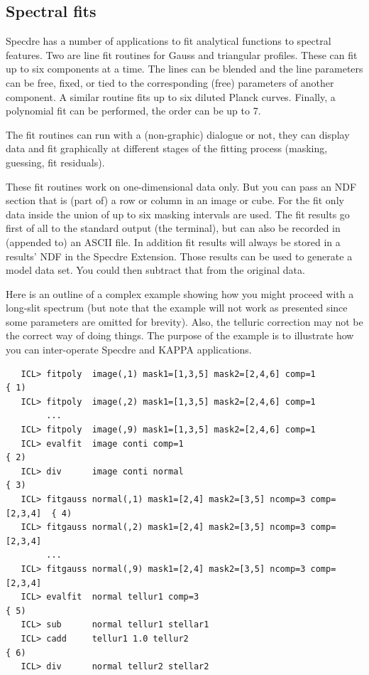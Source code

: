 \documentclass[11pt,twoside]{article}
\newcommand{\xref}[3]{#1}
\newcommand{\xlabel}[1]{}
\begin{document}

\subsection{\label{specdrespecfit}\xlabel{specdrespecfit}Spectral fits}

   Specdre has a number of applications to fit analytical functions to
   spectral features. Two are line fit routines for Gauss and triangular
   profiles. These can fit up to six components at a time. The lines can
   be blended and the line parameters can be free, fixed, or tied to the
   corresponding (free) parameters of another component. A similar
   routine fits up to six diluted Planck curves.  Finally, a polynomial
   fit can be performed, the order can be up to 7.

   The fit routines can run with a (non-graphic) dialogue or not, they
   can display data and fit graphically at different stages of the
   fitting process (masking, guessing, fit residuals).

   These fit routines work on one-dimensional data only. But you can
   pass an NDF section that is (part of) a row or column in an image or
   cube. For the fit only data inside the union of up to six masking
   intervals are used. The fit results go first of all to the standard
   output (the terminal), but can also be recorded in (appended to) an
   ASCII file. In addition fit results will always be stored in a
   results' NDF in the Specdre Extension. Those results can be used to
   generate a model data set. You could then subtract that from the
   original data.

   Here is an outline of a complex example showing how you might proceed
   with a long-slit spectrum (but note that the example will not work
   as presented since some parameters are omitted for brevity).  Also,
   the telluric correction may not be the correct way of doing
   things. The purpose of the example is to illustrate how you can
   inter-operate Specdre and \xref{KAPPA}{sun95}{} applications.

\begin{verbatim}
   ICL> fitpoly  image(,1) mask1=[1,3,5] mask2=[2,4,6] comp=1             { 1)
   ICL> fitpoly  image(,2) mask1=[1,3,5] mask2=[2,4,6] comp=1
        ...
   ICL> fitpoly  image(,9) mask1=[1,3,5] mask2=[2,4,6] comp=1
   ICL> evalfit  image conti comp=1                                       { 2)
   ICL> div      image conti normal                                       { 3)
   ICL> fitgauss normal(,1) mask1=[2,4] mask2=[3,5] ncomp=3 comp=[2,3,4]  { 4)
   ICL> fitgauss normal(,2) mask1=[2,4] mask2=[3,5] ncomp=3 comp=[2,3,4]
        ...
   ICL> fitgauss normal(,9) mask1=[2,4] mask2=[3,5] ncomp=3 comp=[2,3,4]
   ICL> evalfit  normal tellur1 comp=3                                    { 5)
   ICL> sub      normal tellur1 stellar1
   ICL> cadd     tellur1 1.0 tellur2                                      { 6)
   ICL> div      normal tellur2 stellar2
\end{verbatim}
\end{document}
